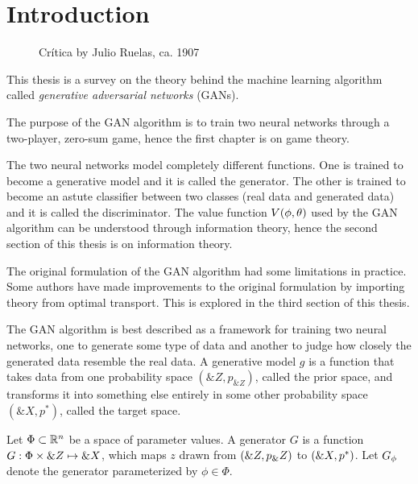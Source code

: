 \section{Introduction}%
\setcounter{page}{1}


\vspace{1cm}

\begin{figure}[h]
  \label{fig:paradise}
  \centering
  \caption{Crítica by Julio Ruelas, ca. 1907}
\end{figure}

\vspace{1cm}

\noindent This thesis is a survey on the theory behind the machine learning
algorithm called \textit{generative adversarial networks} (GANs).

The purpose of the GAN algorithm is to train two neural networks through a
two-player, zero-sum game, hence the first chapter is on game theory.

The two neural networks model completely different functions. One is trained to
become a generative model and it is called the generator. The other is trained
to become an astute classifier between two classes (real data and generated
data) and it is called the discriminator. The value function $V(\phi, \theta)$ used by the
GAN algorithm can be understood through information theory, hence the second
section of this thesis is on information theory.

The original formulation of the GAN algorithm had some limitations in practice.
Some authors have made improvements to the original formulation by importing
theory from optimal transport. This is explored in the third section of this
thesis.

The GAN algorithm is best described as a framework for training two neural
networks, one to generate some type of data and another to judge how closely the
generated data resemble the real data. A generative model $g$ is a function that
takes data from one probability space $(\&Z, p_{\&Z})$, called the prior space,
and transforms it into something else entirely in some other probability space
$(\&X, p^*)$, called the target space.

\begin{definition}%
  \label{def:generator}
  Let $\Phi \subset \mathbb{R}^n$ be a space of parameter values. A
  \textnormal{\sffamily generator} $G$ is a function $G: \Phi \times \&Z \mapsto
  \&X$, which maps $z$ drawn from $(\&Z, p_\&Z)$ to $(\&X, p^*)$. Let $G_\phi$
  denote the generator parameterized by $\phi \in \Phi$.
\end{definition}

